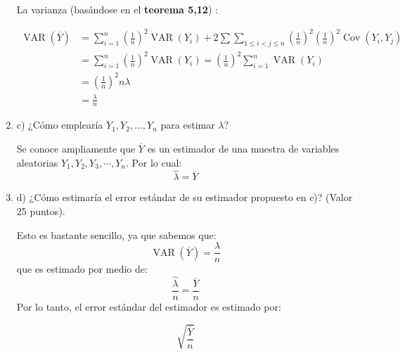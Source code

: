 \begin{enumerate}
\begin{solution}
    \linea 
    
    La varianza (basándose en el \textbf{teorema 5,12}) : 
    
    \begin{align*}
        \operatorname{VAR}(\overline{Y}) &=  \sum_{i=1}^{n} \left(\frac{1}{n}\right)^{2} \operatorname{VAR}\left(Y_{i}\right)+2 \sum \sum_{1 \leq i<j \leq n} \left(\frac{1}{n}\right)^{2} \left(\frac{1}{n}\right)^{2} \operatorname{Cov}\left(Y_{i}, Y_{j}\right) \\
        &= \sum_{i=1}^{n}\left(\frac{1}{n}\right)^2\operatorname{VAR}(Y_i) =\left(\frac{1}{n}\right)^2\sum_{i=1}^{n}\operatorname{VAR}(Y_i) \\
        &= \left(\frac{1}{n}\right)^2n\lambda\\
        &= \frac{\lambda}{n}
    \end{align*}
    
    \end{solution}
\item c) ¿Cómo emplearía $Y_{1}, Y_{2}, \ldots, Y_{n}$ para estimar $\lambda ?$
\begin{solution}
    Se conoce ampliamente que $\overline{Y}$ es un estimador de una muestra de variables aleatorias $Y_1,Y_2,Y_3,\cdots, Y_n$. Por lo cual: 
    $$\hat{\lambda}=\overline{Y}$$
    \end{solution}
\item d) ¿Cómo estimaría el error estándar de su estimador propuesto en c)? (Valor 25 puntos).
\begin{solution}
    Esto es bastante sencillo, ya que sabemos que: 
    $$\operatorname{VAR}(\overline{Y})=\frac{\lambda}{n}$$
que es estimado por medio de: 
$$\frac{\hat{\lambda}}{n}=\frac{\overline{Y}}{n}$$
Por lo tanto, el error estándar del estimador es estimado por: 

$$\sqrt{\frac{\overline{Y}}{n}}$$
    \end{solution}
\end{enumerate}
